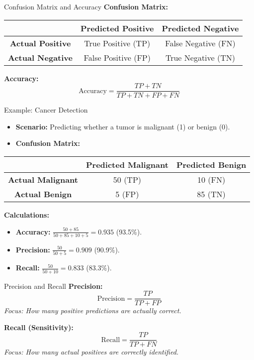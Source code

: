 \documentclass[serif, aspectratio=169]{beamer}
\begin{document}
\begin{frame}{Confusion Matrix and Accuracy}
\textbf{Confusion Matrix:}
\begin{table}[]
\centering
\begin{tabular}{|c|c|c|}
\hline
                & \textbf{Predicted Positive} & \textbf{Predicted Negative} \\\hline
\textbf{Actual Positive} & True Positive (TP) & False Negative (FN) \\\hline
\textbf{Actual Negative} & False Positive (FP) & True Negative (TN) \\\hline
\end{tabular}
\end{table}

\textbf{Accuracy:}
\[
\text{Accuracy} = \frac{TP + TN}{TP + TN + FP + FN}
\]
\end{frame}
\begin{frame}{Example: Cancer Detection}
\begin{itemize}
    \item \textbf{Scenario:} Predicting whether a tumor is malignant (1) or benign (0).
    \item \textbf{Confusion Matrix:}
\end{itemize}
\begin{table}[]
\centering
\begin{tabular}{|c|c|c|}
\hline
                & \textbf{Predicted Malignant} & \textbf{Predicted Benign} \\\hline
\textbf{Actual Malignant} & 50 (TP) & 10 (FN) \\\hline
\textbf{Actual Benign} & 5 (FP) & 85 (TN) \\\hline
\end{tabular}
\end{table}

\textbf{Calculations:}
\begin{itemize}
    \item \textbf{Accuracy:} $\frac{50 + 85}{50 + 85 + 10 + 5} = 0.935$ (93.5\%).
    \item \textbf{Precision:} $\frac{50}{50 + 5} = 0.909$ (90.9\%).
    \item \textbf{Recall:} $\frac{50}{50 + 10} = 0.833$ (83.3\%).
\end{itemize}
\end{frame}

\begin{frame}{Precision and Recall}
\textbf{Precision:}
\[
\text{Precision} = \frac{TP}{TP + FP}
\]
\textit{Focus: How many positive predictions are actually correct.}

\textbf{Recall (Sensitivity):}
\[
\text{Recall} = \frac{TP}{TP + FN}
\]
\textit{Focus: How many actual positives are correctly identified.}
\end{frame}
\end{document}
